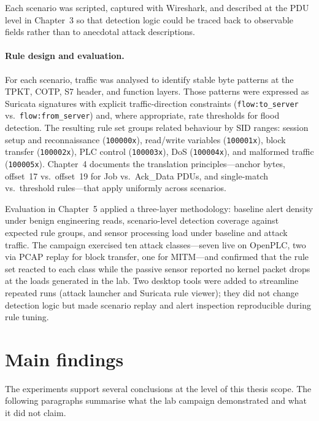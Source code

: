 \documentclass[../main.tex]{subfiles}
\begin{document}
Each scenario was scripted, captured with Wireshark, and described at the PDU level in Chapter~3 so that detection logic could be traced back to observable fields rather than to anecdotal attack descriptions.

\paragraph{Rule design and evaluation.}
For each scenario, traffic was analysed to identify stable byte patterns at the TPKT, COTP, S7 header, and function layers. Those patterns were expressed as Suricata signatures with explicit traffic-direction constraints (\texttt{flow:to\_server} vs.\ \texttt{flow:from\_server}) and, where appropriate, rate thresholds for flood detection. The resulting rule set groups related behaviour by SID ranges: session setup and reconnaissance (\texttt{100000x}), read/write variables (\texttt{100001x}), block transfer (\texttt{100002x}), PLC control (\texttt{100003x}), DoS (\texttt{100004x}), and malformed traffic (\texttt{100005x}). Chapter~4 documents the translation principles---anchor bytes, offset~17 vs.\ offset~19 for Job vs.\ Ack\_Data PDUs, and single-match vs.\ threshold rules---that apply uniformly across scenarios.

Evaluation in Chapter~5 applied a three-layer methodology: baseline alert density under benign engineering reads, scenario-level detection coverage against expected rule groups, and sensor processing load under baseline and attack traffic. The campaign exercised ten attack classes---seven live on OpenPLC, two via PCAP replay for block transfer, one for MITM---and confirmed that the rule set reacted to each class while the passive sensor reported no kernel packet drops at the loads generated in the lab. Two desktop tools were added to streamline repeated runs (attack launcher and Suricata rule viewer); they did not change detection logic but made scenario replay and alert inspection reproducible during rule tuning.

\section{Main findings}

The experiments support several conclusions at the level of this thesis scope. The following paragraphs summarise what the lab campaign demonstrated and what it did not claim.
\end{document}
